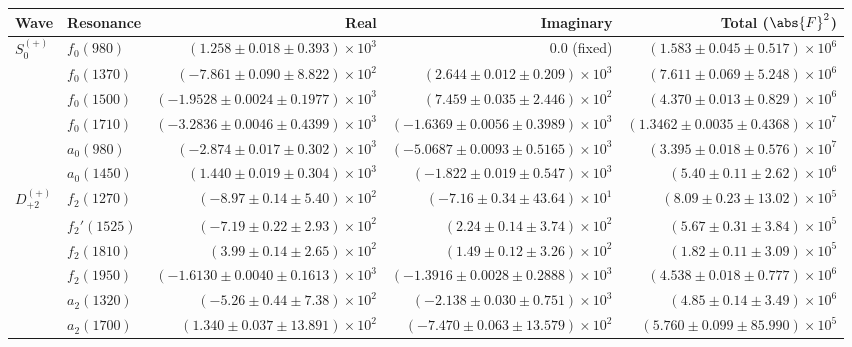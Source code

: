 \begin{table}[ht]
    \begin{center}
        \begin{tabular}{llrrr}\toprule
        Wave & Resonance & Real & Imaginary & Total ($\abs{F}^2$) \\\midrule
$S_{0}^{(+)}$ & $f_{0}(980)$ & $(1.258 \pm 0.018 \pm 0.393) \times 10^{3}$ & $0.0$ (fixed) & $(1.583 \pm 0.045 \pm 0.517) \times 10^{6}$ \\
 & $f_{0}(1370)$ & $(-7.861 \pm 0.090 \pm 8.822) \times 10^{2}$ & $(2.644 \pm 0.012 \pm 0.209) \times 10^{3}$ & $(7.611 \pm 0.069 \pm 5.248) \times 10^{6}$ \\
 & $f_{0}(1500)$ & $(-1.9528 \pm 0.0024 \pm 0.1977) \times 10^{3}$ & $(7.459 \pm 0.035 \pm 2.446) \times 10^{2}$ & $(4.370 \pm 0.013 \pm 0.829) \times 10^{6}$ \\
 & $f_{0}(1710)$ & $(-3.2836 \pm 0.0046 \pm 0.4399) \times 10^{3}$ & $(-1.6369 \pm 0.0056 \pm 0.3989) \times 10^{3}$ & $(1.3462 \pm 0.0035 \pm 0.4368) \times 10^{7}$ \\
 & $a_{0}(980)$ & $(-2.874 \pm 0.017 \pm 0.302) \times 10^{3}$ & $(-5.0687 \pm 0.0093 \pm 0.5165) \times 10^{3}$ & $(3.395 \pm 0.018 \pm 0.576) \times 10^{7}$ \\
 & $a_{0}(1450)$ & $(1.440 \pm 0.019 \pm 0.304) \times 10^{3}$ & $(-1.822 \pm 0.019 \pm 0.547) \times 10^{3}$ & $(5.40 \pm 0.11 \pm 2.62) \times 10^{6}$ \\
$D_{+2}^{(+)}$ & $f_{2}(1270)$ & $(-8.97 \pm 0.14 \pm 5.40) \times 10^{2}$ & $(-7.16 \pm 0.34 \pm 43.64) \times 10^{1}$ & $(8.09 \pm 0.23 \pm 13.02) \times 10^{5}$ \\
 & $f_{2}'(1525)$ & $(-7.19 \pm 0.22 \pm 2.93) \times 10^{2}$ & $(2.24 \pm 0.14 \pm 3.74) \times 10^{2}$ & $(5.67 \pm 0.31 \pm 3.84) \times 10^{5}$ \\
 & $f_{2}(1810)$ & $(3.99 \pm 0.14 \pm 2.65) \times 10^{2}$ & $(1.49 \pm 0.12 \pm 3.26) \times 10^{2}$ & $(1.82 \pm 0.11 \pm 3.09) \times 10^{5}$ \\
 & $f_{2}(1950)$ & $(-1.6130 \pm 0.0040 \pm 0.1613) \times 10^{3}$ & $(-1.3916 \pm 0.0028 \pm 0.2888) \times 10^{3}$ & $(4.538 \pm 0.018 \pm 0.777) \times 10^{6}$ \\
 & $a_{2}(1320)$ & $(-5.26 \pm 0.44 \pm 7.38) \times 10^{2}$ & $(-2.138 \pm 0.030 \pm 0.751) \times 10^{3}$ & $(4.85 \pm 0.14 \pm 3.49) \times 10^{6}$ \\
 & $a_{2}(1700)$ & $(1.340 \pm 0.037 \pm 13.891) \times 10^{2}$ & $(-7.470 \pm 0.063 \pm 13.579) \times 10^{2}$ & $(5.760 \pm 0.099 \pm 85.990) \times 10^{5}$ \\

\end{tabular}
\end{center}
\end{table}
